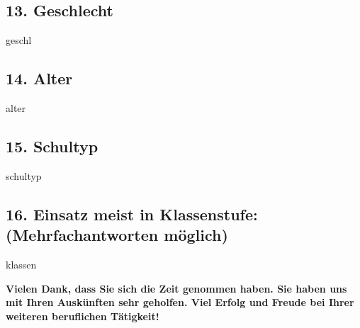 \documentclass[a4paper,10pt]{article}
\begin{document}
{\subsection*{13. Geschlecht}
\vspace{0.5cm}
\begin{questionmult}{geschl}
	\begin{choiceshoriz}
	\end{choiceshoriz}
\end{questionmult}

\subsection*{14. Alter}
\vspace{0.5cm}
\begin{questionmult}{alter}
	\begin{choices}
	\end{choices}
\end{questionmult}

\subsection*{15. Schultyp}
\vspace{0.5cm}
\begin{questionmult}{schultyp}
	\begin{choices}
		\scoring{b=1}
		\scoring{b=2}
		\scoring{b=3}
		\scoring{b=4}
		\scoring{b=5}
		\scoring{b=6}
	\end{choices}
\end{questionmult}

\subsection*{16. Einsatz meist in Klassenstufe: \\ (Mehrfachantworten möglich)}
\vspace{0.5cm}
\begin{questionmult}{klassen}
	\begin{choices}
	\end{choices}
\end{questionmult}


\bigskip

\begin{flushleft}
\textbf{Vielen Dank, dass Sie sich die Zeit genommen haben. Sie haben uns mit Ihren Auskünften sehr geholfen. Viel Erfolg und Freude bei Ihrer weiteren beruflichen Tätigkeit!}
\end{flushleft}


}
\end{document}
